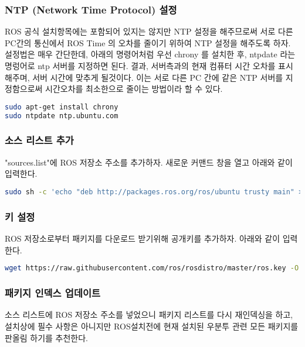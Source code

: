 \subsubsection{NTP (Network Time Protocol) 설정}
ROS 공식 설치항목에는 포함되어 있지는 않지만 NTP 설정을 해주므로써 서로 다른 PC간의 통신에서 ROS Time 의 오차를 줄이기 위하여 NTP 설정을 해주도록 하자. 설정법은 매우 간단한데, 아래의 명령어처럼 우선 chrony 를 설치한 후, ntpdate 라는 명렁어로 ntp 서버를 지정하면 된다. 결과, 서버측과의 현재 컴퓨터 시간 오차를 표시해주며, 서버 시간에 맞추게 될것이다. 이는 서로 다른 PC 간에 같은 NTP 서버를 지정함으로써 시간오차를 최소한으로 줄이는 방법이라 할 수 있다.

\begin{lstlisting}[language=bash]
sudo apt-get install chrony
sudo ntpdate ntp.ubuntu.com
\end{lstlisting}

\subsubsection{소스 리스트 추가}
"sources.list"에 ROS 저장소 주소를 추가하자. 새로운 커맨드 창을 열고 아래와 같이 입력한다. 

\begin{lstlisting}[language=bash]
sudo sh -c 'echo "deb http://packages.ros.org/ros/ubuntu trusty main" > /etc/apt/sources.list.d/ros-latest.list'
\end{lstlisting}

\subsubsection{키 설정}
ROS 저장소로부터 패키지를 다운로드 받기위해 공개키를 추가하자. 아래와 같이 입력한다.

\begin{lstlisting}[language=bash]
wget https://raw.githubusercontent.com/ros/rosdistro/master/ros.key -O - | sudo apt-key add -
\end{lstlisting}

\subsubsection{패키지 인덱스 업데이트}
소스 리스트에 ROS 저장소 주소를 넣었으니 패키지 리스트를 다시 재인덱싱을 하고, 설치상에 필수 사항은 아니지만 ROS설치전에 현재 설치된 우분투 관련 모든 패키지를 판올림 하기를 추천한다.

